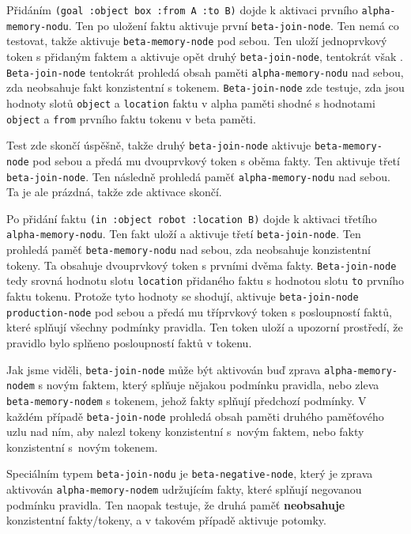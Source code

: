 Přidáním \verb|(goal :object box :from A :to B)| dojde k aktivaci prvního
\verb|alpha-memory-nodu|. Ten po uložení faktu aktivuje první
\verb|beta-join-node|. Ten nemá co testovat, takže aktivuje
\verb|beta-memory-node| pod sebou. Ten uloží jednoprvkový token s přidaným
faktem a aktivuje opět druhý \verb|beta-join-node|, tentokrát však .
\verb|Beta-join-node| tentokrát prohledá obsah paměti \verb|alpha-memory-nodu|
nad sebou, zda neobsahuje fakt konzistentní s tokenem. \verb|Beta-join-node| zde
testuje, zda jsou hodnoty slotů \verb|object| a \verb|location| faktu v alpha
paměti shodné s hodnotami \verb|object| a \verb|from| prvního faktu tokenu v
beta paměti.

Test zde skončí úspěšně, takže druhý \verb|beta-join-node| aktivuje
\verb|beta-memory-node| pod sebou a předá mu dvouprvkový token s oběma fakty.
Ten aktivuje  třetí \verb|beta-join-node|. Ten následně prohledá paměť
\verb|alpha-memory-nodu| nad sebou. Ta je ale prázdná, takže zde aktivace
skončí.

Po přidání faktu \verb|(in :object robot :location B)| dojde k aktivaci třetího
\verb|alpha-memory-nodu|. Ten fakt uloží a aktivuje  třetí
\verb|beta-join-node|. Ten prohledá paměť \verb|beta-memory-nodu| nad sebou, zda
neobsahuje konzistentní tokeny. Ta obsahuje dvouprvkový token s prvními dvěma
fakty. \verb|Beta-join-node| tedy srovná hodnotu slotu \verb|location| přidaného
faktu s hodnotou slotu \verb|to| prvního faktu tokenu. Protože tyto hodnoty se
shodují, aktivuje \verb|beta-join-node| \verb|production-node| pod sebou a předá
mu tříprvkový token s posloupností faktů, které splňují všechny podmínky
pravidla. Ten token uloží a upozorní prostředí, že pravidlo bylo splňeno
posloupností faktů v tokenu.

Jak jsme viděli, \verb|beta-join-node| může být aktivován buď zprava
\verb|alpha-memory-nodem| s novým faktem, který splňuje nějakou podmínku
pravidla, nebo zleva \verb|beta-memory-nodem| s tokenem, jehož fakty splňují
předchozí podmínky. V každém případě \verb|beta-join-node| prohledá obsah paměti
druhého paměťového uzlu nad ním, aby nalezl tokeny konzistentní s~novým faktem,
nebo fakty konzistentní s~novým tokenem.

Speciálním typem \verb|beta-join-nodu| je \verb|beta-negative-node|, který je
zprava aktivován \verb|alpha-memory-nodem| udržujícím fakty, které splňují
negovanou podmínku pravidla. Ten naopak testuje, že druhá paměť
\textbf{neobsahuje} konzistentní fakty/tokeny, a v takovém případě aktivuje
potomky.

